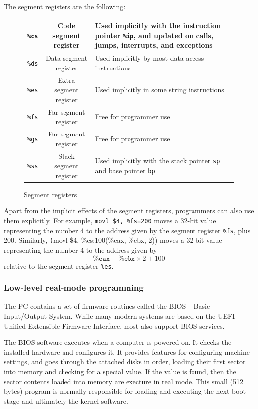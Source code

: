 \documentclass[toc]{../cs-classes/cs-classes}
\begin{document}
The segment registers are the following:
\begin{figure}[H]
    \centering
    \begin{tabular}{|c|c|p{8cm}|}
        \hline
        \texttt{\%cs} & Code segment register & Used implicitly with the instruction pointer \texttt{\%ip}, and updated on calls, jumps, interrupts, and exceptions\\
        \hline
        \texttt{\%ds} & Data segment register & Used implicitly by most data access instructions\\
        \hline
        \texttt{\%es} & Extra segment register & Used implicitly in some string instructions\\
        \hline
        \texttt{\%fs} & Far segment register & Free for programmer use\\
        \hline
        \texttt{\%gs} & Far segment register & Free for programmer use\\
        \hline
        \texttt{\%ss} & Stack segment register & Used implicitly with the stack pointer \texttt{sp} and base pointer \texttt{bp}\\
        \hline
    \end{tabular}
    \caption{Segment registers}
\end{figure}
Apart from the implicit effects of the segment registers, programmers can also use them explicitly. For example, \texttt{movl \$4, \%fs=200} moves a 32-bit value representing the number 4 to the address given by the segment register \texttt{\%fs}, plus 200. Similarly, \texttt(movl \$4, \%es:100(\%eax, \%ebx, 2)) moves a 32-bit value representing the number 4 to the address given by
\begin{equation*}
    \texttt{\%eax} + \texttt{\%ebx} \times 2 + 100
\end{equation*}
relative to the segment register \texttt{\%es}.

\subsubsection{Low-level real-mode programming}
The PC contains a set of firmware routines called the BIOS -- Basic Input/Output System. While many modern systems are based on the UEFI -- Unified Extensible Firmware Interface, most also support BIOS services.

The BIOS software executes when a computer is powered on. It checks the installed hardware and configures it. It provides features for configuring machine settings, and goes through the attached disks in order, loading their first sector into memory and checking for a special value. If the value is found, then the sector contents loaded into memory are execture in real mode. This small (512 bytes) program is normally responsible for loading and executing the next boot stage and ultimately the kernel software.
\end{document}
